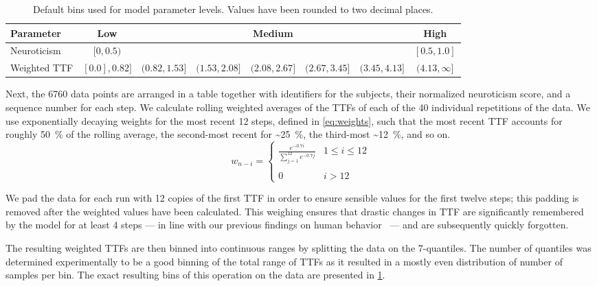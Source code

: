 \begin{table}[]
    \centering
    \caption{%
        Default bins used for model parameter levels.
        Values have been rounded to two decimal places.
    }
    \label{tab:defaultbins}
    \begin{tabular}{@{}lccccccc@{}}
        \toprule
        \textbf{Parameter} & \textbf{Low} & & & \textbf{Medium} & & & \textbf{High}         \\ \midrule
        Neuroticism        & \( [0, 0.5) \) & & & & & & \( [0.5, 1.0] \)      \\
        Weighted TTF & \([0.0], 0.82]\) & \((0.82, 1.53]\) & \((1.53, 2.08]\) & \((2.08, 2.67]\) & \((2.67, 3.45]\) & \((3.45, 4.13]\) & \((4.13, \infty]\)
    \end{tabular}
\end{table}

Next, the \num{6760} data points are arranged in a table together with identifiers for the subjects, their normalized neuroticism score, and a sequence number for each step.
We calculate rolling weighted averages of the \glspl{TTF} of each of the \num{40} individual repetitions of the data.
We use exponentially decaying weights for the most recent \num{12} steps, defined in \cref{eq:weights}, such that the most recent \gls{TTF} accounts for roughly \SI{50}{\percent} of the rolling average, the second-most recent for \textasciitilde\SI{25}{\percent}, the third-most \textasciitilde\SI{12}{\percent}, and so on.\begin{equation}\label{eq:weights}
    w_{n - i} = 
    \left\{ \begin{array}{ll}
        \frac{e^{-0.7 i}}{\sum\limits^{12}_{j=1} e^{-0.7 j}} & 1 \leq i \leq 12 \\
        & \\
        0 & i > 12
    \end{array} \right.
\end{equation}

We pad the data for each run with \num{12} copies of the first \gls{TTF} in order to ensure sensible values for the first twelve steps; this padding is removed after the weighted values have been calculated.
This weighing ensures that drastic changes in \gls{TTF} are significantly remembered by the model for at least \num{4} steps --- in line with our previous findings on human behavior~\cite{olguinmunoz2021impact} --- and are subsequently quickly forgotten.

The resulting weighted \glspl{TTF} are then binned into continuous ranges by splitting the data on the \num{7}-quantiles.
The number of quantiles was determined experimentally to be a good binning of the total range of \glspl{TTF} as it resulted in a mostly even distribution of number of samples per bin.
The exact resulting bins of this operation on the data are presented in \cref{tab:defaultbins}.

